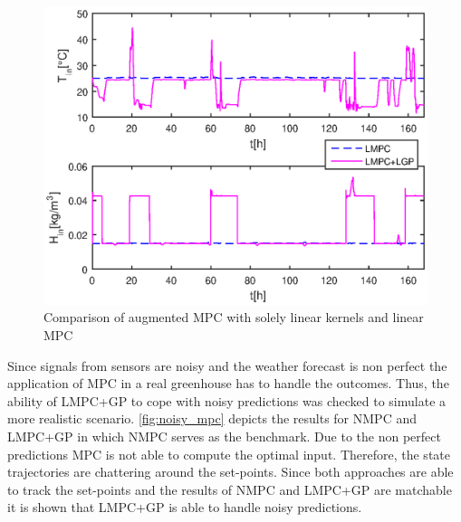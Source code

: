 \begin{figure}[!t]
\begin{center}
		\includegraphics[width=\textwidth]{../Figures/linear_kernel.eps}
		\caption{Comparison of augmented MPC with solely linear kernels and linear MPC}
		\label{fig:mpc_linear_kernels}
\end{center}
\end{figure}

Since signals from sensors are noisy and the weather forecast is non perfect the application of MPC in a real greenhouse has to handle the outcomes.
Thus, the ability of LMPC+GP to cope with noisy predictions was checked to simulate a more realistic scenario.
\cref{fig:noisy_mpc} depicts the results for NMPC and LMPC+GP in which NMPC serves as the benchmark.
Due to the non perfect predictions MPC is not able to compute the optimal input.
Therefore, the state trajectories are chattering around the set-points.
Since both approaches are able to track the set-points and the results of NMPC and LMPC+GP are matchable it is shown that LMPC+GP is able to handle noisy predictions.

